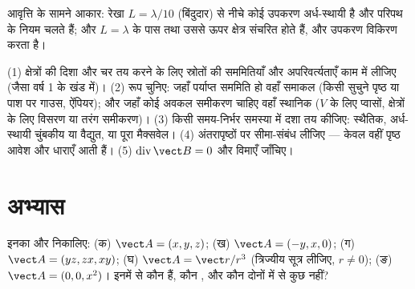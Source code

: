 \begin{omfigure}

{\small आवृत्ति के सामने आकार: रेखा $L = \lambda/10$ (बिंदुदार) से नीचे कोई
उपकरण अर्ध-स्थायी है और परिपथ के नियम चलते हैं; और $L = \lambda$ के पास तथा
उससे ऊपर क्षेत्र संचरित होते हैं, और उपकरण विकिरण करता है।}
\end{omfigure}

\begin{method}[स्थानिक समीकरणों का प्रयोग]\label{met:b2:maxwell-equations:method}
(1) क्षेत्रों की दिशा और चर तय करने के लिए स्रोतों की सममितियाँ और
अपरिवर्त्यताएँ काम में लीजिए (जैसा वर्ष 1 के खंड में)।
(2) रूप चुनिए: जहाँ पर्याप्त सममिति हो वहाँ समाकल (किसी सुचुने पृष्ठ या
पाश पर गाउस, ऐंपियर); और जहाँ कोई अवकल समीकरण चाहिए वहाँ स्थानिक
($V$ के लिए प्वासों, क्षेत्रों के लिए विसरण या तरंग समीकरण)।
(3) किसी समय-निर्भर समस्या में दशा तय कीजिए:
स्थैतिक, अर्ध-स्थायी चुंबकीय या वैद्युत, या पूरा मैक्सवेल। (4)
अंतरापृष्ठों पर सीमा-संबंध लीजिए --- केवल वहीं
पृष्ठ आवेश और धाराएँ आती हैं। (5)
$\operatorname{div}\vect B = 0$ और विमाएँ जाँचिए।
\end{method}

\section{अभ्यास}

\begin{exercise}[$\star$]\label{exo:b2:maxwell-equations:1}
इनका  और  निकालिए: (क) $\vect A = (x, y, z)$; (ख)
$\vect A = (-y, x, 0)$; (ग) $\vect A = (yz, zx, xy)$; (घ) $\vect A = \vect r/r^3$
(त्रिज्यीय सूत्र लीजिए, $r \ne 0$); (ङ) $\vect A = (0, 0, x^2)$। इनमें से कौन
 हैं, कौन , और कौन दोनों में से कुछ नहीं?
\end{exercise}

